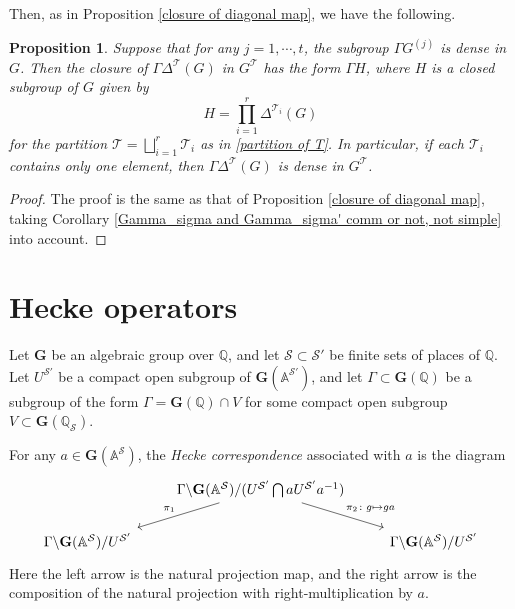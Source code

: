 \documentclass[11pt,oneside,reqno]{amsart}
\newcommand{\bfG}{\mathbf{G}}
\newcommand{\Q}{\mathbb{Q}}
\newcommand{\Tcal}{\mathcal{T}}
\newcommand{\Gbf}{\mathbf{G}}
\newcommand{\bcS}{\mathcal{S}}
\theoremstyle{plain}
\newtheorem{proposition}[theorem]{Proposition}
\begin{document}
	
	
	
	
	
	
	
	Then, as in Proposition \ref{closure of diagonal map}, we have the following.
	\begin{proposition}\label{closure of diagonal map, not simple}
		Suppose that for any $j=1,\cdots,t$, the subgroup $\Gamma G^{(j)}$ is dense in $G$.
		Then the closure of $\Gamma\Delta^\Tcal(G)$ in $G^\Tcal$ has the form $\Gamma H$, where $H$ is a closed subgroup of $G$ given by
		\[
		H=\prod_{i=1}^r\Delta^{\Tcal_i}(G)
		\]
		for the partition $\Tcal=\bigsqcup_{i=1}^r\Tcal_i$ as in \eqref{partition of T}.
		In particular, if each $\Tcal_i$ contains only one element, then $\Gamma\Delta^{\Tcal}(G)$ is dense in $G^\Tcal$.
	\end{proposition}
	\begin{proof}
		The proof is the same as that of Proposition \ref{closure of diagonal map}, taking Corollary \ref{Gamma_sigma and Gamma_sigma' comm or not, not simple} into account.
	\end{proof}
	
	
	
	
	
	
	
	
	
	
	
	
	
	
	\section{Hecke operators}\label{Hecke operators}
	Let $\bfG$ be an algebraic group over $\Q$, and let $\bcS\subset\bcS'$ be finite sets of places of $\Q$. Let $U^{\bcS'}$ be a compact open subgroup of $\bfG(\mathbb{A}^{\bcS'})$, and let $\Gamma\subset\bfG(\Q)$ be a subgroup of the form $\Gamma=\Gbf(\Q)\cap V$ for some compact open subgroup $V\subset \bfG(\Q_{\bcS})$.
	
	
	
	
	
	For any $a\in\bfG(\mathbb{A}^{\bcS})$, the \emph{Hecke correspondence} associated with $a$ is the diagram
	\[
	\begin{tikzcd}
		&
		\Gamma
		\backslash
		\bfG(\mathbb{A}^{\bcS})/(U^{\bcS'}\bigcap aU^{\bcS'} a^{-1})
		\arrow[ld,"\pi_1"']
		\arrow[rd,"\pi_2\colon g\mapsto ga"]
		&
		\\
		\Gamma
		\backslash
		\bfG(\mathbb{A}^{\bcS})/U^{\bcS'}
		&
		&
		\Gamma
		\backslash
		\bfG(\mathbb{A}^{\bcS})/U^{\bcS'}
	\end{tikzcd}
	\]
	Here the left arrow is the natural projection map, and the right arrow is the composition of the natural projection with right-multiplication by $a$.
	
\end{document}
